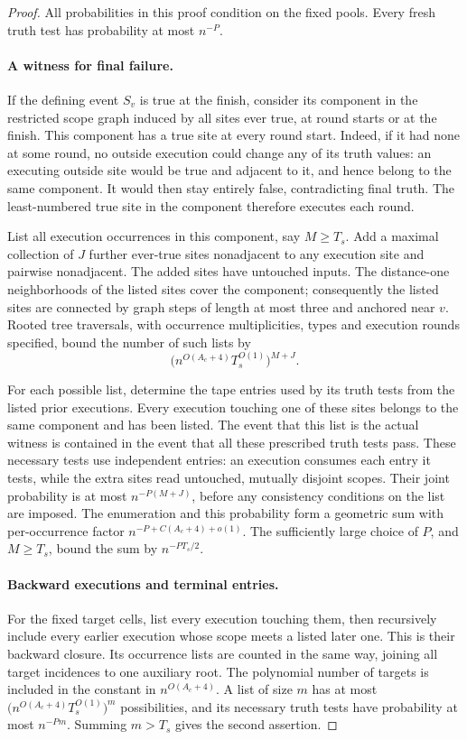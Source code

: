 \begin{proof}\leavevmode\par
All probabilities in this proof condition on the fixed pools. Every
fresh truth test has probability at most \(n^{-P}\).

\paragraph{A witness for final failure.}
If the defining event \(S_v\) is true at the finish, consider its
component in the restricted scope graph induced by all sites ever true,
at round starts or at the finish. This component has a true site at every
round start. Indeed, if it had none at some round, no outside execution
could change any of its truth values: an executing outside site would be
true and adjacent to it, and hence belong to the same component. It would
then stay entirely false, contradicting final truth. The least-numbered
true site in the component therefore executes each round.

List all execution occurrences in this component, say \(M\ge T_s\).
Add a maximal collection of \(J\) further ever-true sites nonadjacent to
any execution site and pairwise nonadjacent. The added sites have untouched
inputs. The distance-one neighborhoods of the listed sites cover the
component; consequently the listed sites are connected by graph steps of
length at most three and anchored near \(v\). Rooted tree traversals,
with occurrence multiplicities, types and execution rounds specified,
bound the number of such lists by
\[
 \bigl(n^{O(A_c+4)}T_s^{O(1)}\bigr)^{M+J}.
\]

For each possible list, determine the tape entries used by its truth
tests from the listed prior executions. Every execution touching one of
these sites belongs to the same component and has been listed. The event
that this list is the actual witness is contained in the event that all
these prescribed truth tests pass. These necessary tests use independent
entries: an execution consumes each entry it tests, while the extra sites
read untouched, mutually disjoint scopes. Their joint probability is at
most \(n^{-P(M+J)}\), before any consistency conditions on the list are
imposed. The enumeration and this probability form a geometric sum with
per-occurrence factor
\(n^{-P+C(A_c+4)+o(1)}\). The sufficiently large choice of \(P\),
and \(M\ge T_s\), bound the sum by \(n^{-PT_s/2}\).

\paragraph{Backward executions and terminal entries.}
For the fixed target cells, list every execution touching them, then
recursively include every earlier execution whose scope meets a listed
later one. This is their backward closure. Its occurrence lists are
counted in the same way, joining all target incidences to one auxiliary
root. The polynomial number of targets is included in the constant in
\(n^{O(A_c+4)}\). A list of size \(m\) has at most
\(\bigl(n^{O(A_c+4)}T_s^{O(1)}\bigr)^m\) possibilities, and its
necessary truth tests have probability at most \(n^{-Pm}\). Summing
\(m>T_s\) gives the second assertion.


\end{proof}

